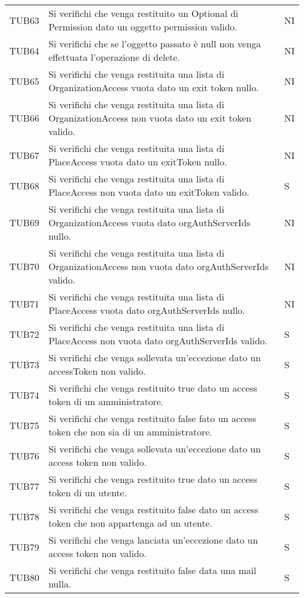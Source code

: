 {\begin{longtable}{ c C{13cm} C{1cm}}
TUB63 & Si verifichi che venga restituito un Optional di Permission dato un oggetto permission valido. & NI \\
TUB64 & Si verifichi che se l'oggetto passato è null non venga effettuata l'operazione di delete. & NI \\
TUB65 & Si verifichi che venga restituita una lista di OrganizationAccess vuota dato un exit token nullo. & NI \\
TUB66 & Si verifichi che venga restituita una lista di OrganizationAccess non vuota dato un exit token valido. & NI \\
TUB67 & Si verifichi che venga restituita una lista di PlaceAccess vuota dato un exitToken nullo. & NI \\
TUB68 & Si verifichi che venga restituita una lista di PlaceAccess non vuota dato un exitToken valido. & S \\
TUB69 & Si verifichi che venga restituita una lista di OrganizationAccess vuota dato orgAuthServerIds nullo. & NI \\
TUB70 & Si verifichi che venga restituita una lista di OrganizationAccess non vuota dato orgAuthServerIds valido. & NI \\
TUB71 & Si verifichi che venga restituita una lista di PlaceAccess vuota dato orgAuthServerIds nullo. & NI \\
TUB72 & Si verifichi che venga restituita una lista di PlaceAccess non vuota dato orgAuthServerIds valido. & S \\
TUB73 & Si verifichi che venga sollevata un'eccezione dato un accessToken non valido. & S \\
TUB74 & Si verifichi che venga restituito true dato un access token di un amministratore. & S \\
TUB75 & Si verifichi che venga restituito false fato un access token che non sia di un amministratore. & S \\
TUB76 & Si verifichi che venga sollevata un'eccezione dato un access token non valido. & S \\
TUB77 & Si verifichi che venga restituito true dato un access token di un utente. & S \\
TUB78 & Si verifichi che venga restituito false dato un access token che non appartenga ad un utente. & S \\
TUB79 & Si verifichi che venga lanciata un'eccezione dato un access token non valido. & S \\
TUB80 & Si verifichi che venga restituito false data una mail nulla. & S \\

\end{longtable}}
